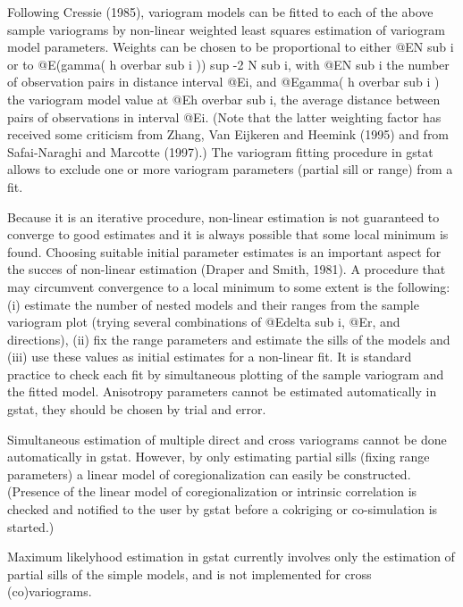 \documentclass{article}
\begin{document}
Following Cressie (1985), variogram models can be fitted to each of the
above sample variograms by non-linear weighted least squares estimation
of variogram model parameters. Weights can be chosen to be proportional
to either @E{N sub i} or to @E{(gamma( h overbar sub i )) sup -2 N sub
i}, with @E{N sub i} the number of observation pairs in distance
interval @E{i}, and @E{gamma( h overbar sub i )} the variogram model
value at @E{h overbar sub i}, the average distance between pairs of
observations in interval @E{i}. (Note that the latter weighting factor
has received some criticism from Zhang, Van Eijkeren and Heemink (1995)
and from Safai-Naraghi and Marcotte (1997).) The variogram fitting
procedure in gstat allows to exclude one or more variogram parameters
(partial sill or range) from a fit.

Because it is an iterative procedure, non-linear estimation is not
guaranteed to converge to good estimates and it is always possible that
some local minimum is found. Choosing suitable initial parameter
estimates is an important aspect for the succes of non-linear estimation
(Draper and Smith, 1981). A procedure that may circumvent convergence to
a local minimum to some extent is the following: (i) estimate the number
of nested models and their ranges from the sample variogram plot (trying
several combinations of @E{delta sub i}, @E{r}, and directions), (ii)
fix the range parameters and estimate the sills of the models and (iii)
use these values as initial estimates for a non-linear fit. It is
standard practice to check each fit by simultaneous plotting of the
sample variogram and the fitted model. Anisotropy parameters cannot be
estimated automatically in gstat, they should be chosen by trial and
error.

Simultaneous estimation of multiple direct and cross variograms cannot
be done automatically in gstat. However, by only estimating partial
sills (fixing range parameters) a linear model of coregionalization can
easily be constructed. (Presence of the linear model of
coregionalization or intrinsic correlation is checked and notified to
the user by gstat before a cokriging or co-simulation is started.)

Maximum likelyhood estimation in gstat currently involves only the
estimation of partial sills of the simple models, and is not implemented
for cross (co)variograms.
\end{document}
